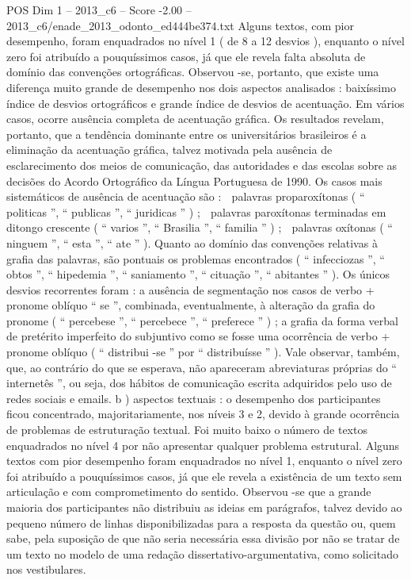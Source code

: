\begin{textsample}{POS Dim 1 – 2013\_c6 – Score -2.00 – 2013\_c6/enade\_2013\_odonto\_ed444be374.txt}
Alguns textos, com pior desempenho, foram enquadrados no nível 1 ( de 8 a 12 desvios ), enquanto o nível zero foi atribuído a pouquíssimos casos, já que ele revela falta absoluta de domínio das convenções ortográficas.
Observou -se, portanto, que existe uma diferença muito grande de desempenho nos dois aspectos analisados : baixíssimo índice de desvios ortográficos e grande índice de desvios de acentuação.
Em vários casos, ocorre ausência completa de acentuação gráfica.
Os resultados revelam, portanto, que a tendência dominante entre os universitários brasileiros é a eliminação da acentuação gráfica, talvez motivada pela ausência de esclarecimento dos meios de comunicação, das autoridades e das escolas sobre as decisões do Acordo Ortográfico da Língua Portuguesa de 1990.
Os casos mais sistemáticos de ausência de acentuação são :  palavras proparoxítonas ( “ politicas ”, “ publicas ”, “ juridicas ” ) ;  palavras paroxítonas terminadas em ditongo crescente ( “ varios ”, “ Brasilia ”, “ familia ” ) ;  palavras oxítonas ( “ ninguem ”, “ esta ”, “ ate ” ).
Quanto ao domínio das convenções relativas à grafia das palavras, são pontuais os problemas encontrados ( “ infecciozas ”, “ obtos ”, “ hipedemia ”, “ saniamento ”, “ cituação ”, “ abitantes ” ).
Os únicos desvios recorrentes foram : a ausência de segmentação nos casos de verbo + pronome oblíquo “ se ”, combinada, eventualmente, à alteração da grafia do pronome ( “ percebese ”, “ percebece ”, “ preferece ” ) ; a grafia da forma verbal de pretérito imperfeito do subjuntivo como se fosse uma ocorrência de verbo + pronome oblíquo ( “ distribui -se ” por “ distribuísse ” ).
Vale observar, também, que, ao contrário do que se esperava, não apareceram abreviaturas próprias do “ internetês ”, ou seja, dos hábitos de comunicação escrita adquiridos pelo uso de redes sociais e emails. b ) aspectos textuais : o desempenho dos participantes ficou concentrado, majoritariamente, nos níveis 3 e 2, devido à grande ocorrência de problemas de estruturação textual.
Foi muito baixo o número de textos enquadrados no nível 4 por não apresentar qualquer problema estrutural.
Alguns textos com pior desempenho foram enquadrados no nível 1, enquanto o nível zero foi atribuído a pouquíssimos casos, já que ele revela a existência de um texto sem articulação e com comprometimento do sentido.
Observou -se que a grande maioria dos participantes não distribuiu as ideias em parágrafos, talvez devido ao pequeno número de linhas disponibilizadas para a resposta da questão ou, quem sabe, pela suposição de que não seria necessária essa divisão por não se tratar de um texto no modelo de uma redação dissertativo-argumentativa, como solicitado nos vestibulares.

\end{textsample}
